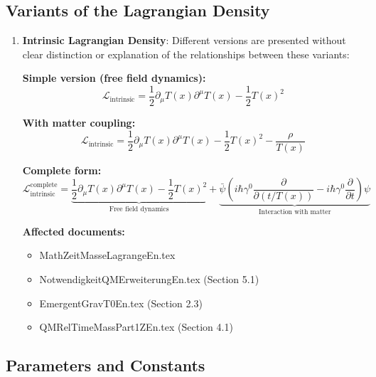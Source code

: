\documentclass[12pt,a4paper]{article}
\newcommand{\Tfield}{T(x)}
\begin{document}
	\subsection{Variants of the Lagrangian Density}
	
	\begin{enumerate}[label=\textbf{P\arabic*.},resume]
		\item \textbf{Intrinsic Lagrangian Density}: Different versions are presented without clear distinction or explanation of the relationships between these variants:
		
		\textbf{Simple version (free field dynamics):}
		\begin{equation}
			\mathcal{L}_{\text{intrinsic}} = \frac{1}{2} \partial_\mu \Tfield \partial^\mu \Tfield - \frac{1}{2}\Tfield^2
		\end{equation}
		
		\textbf{With matter coupling:}
		\begin{equation}
			\mathcal{L}_{\text{intrinsic}} = \frac{1}{2} \partial_\mu \Tfield \partial^\mu \Tfield - \frac{1}{2}\Tfield^2 - \frac{\rho}{\Tfield}
		\end{equation}
		
		\textbf{Complete form:}
		\begin{equation}
			\mathcal{L}_{\text{intrinsic}}^{\text{complete}} = \underbrace{\frac{1}{2} \partial_\mu \Tfield \partial^\mu \Tfield - \frac{1}{2}\Tfield^2}_{\text{Free field dynamics}} + \underbrace{\bar{\psi} \left( i\hbar \gamma^0 \frac{\partial}{\partial (t/\Tfield)} - i\hbar \gamma^0 \frac{\partial}{\partial t} \right) \psi}_{\text{Interaction with matter}}
		\end{equation}
		
		\textbf{Affected documents:}
		\begin{itemize}
			\item MathZeitMasseLagrangeEn.tex
			\item NotwendigkeitQMErweiterungEn.tex (Section 5.1)
			\item EmergentGravT0En.tex (Section 2.3)
			\item QMRelTimeMassPart1ZEn.tex (Section 4.1)
		\end{itemize}
	\end{enumerate}
	
	\subsection{Parameters and Constants}
	
\end{document}
